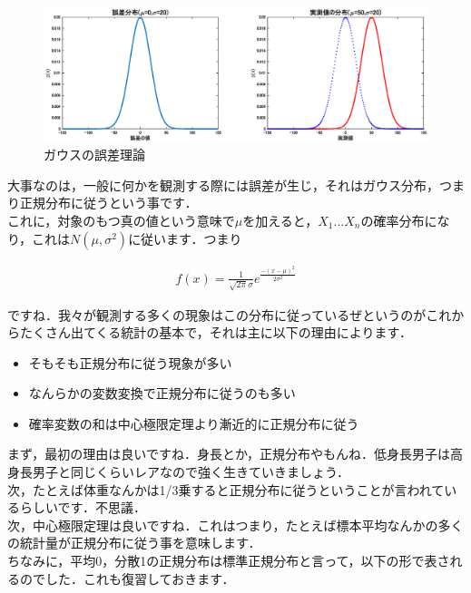 \documentclass[11pt,a4paper,uplatex]{ujreport} 	%
\begin{document}
\begin{figure}[H]
  \centering
  \includegraphics[width=18cm]{../figures/gauss-error.eps}
  \caption{ガウスの誤差理論}
\end{figure}

大事なのは，一般に何かを観測する際には誤差が生じ，それはガウス分布，つまり正規分布に従うという事です．\\

これに，対象のもつ真の値という意味で$\mu$を加えると，$X_1...X_n$の確率分布になり，これは$N(\mu, \sigma^2)$に従います．つまり

\begin{align}
  f(x) = \frac{1}{\sqrt{2\pi}\sigma}e^{\frac{-(x-\mu)^2}{2\sigma^2}}
\end{align}

ですね．我々が観測する多くの現象はこの分布に従っているぜというのがこれからたくさん出てくる統計の基本で，それは主に以下の理由によります．

\begin{itemize}
  \item そもそも正規分布に従う現象が多い
  \item なんらかの変数変換で正規分布に従うのも多い
  \item 確率変数の和は中心極限定理より漸近的に正規分布に従う
\end{itemize}

まず，最初の理由は良いですね．身長とか，正規分布やもんね．低身長男子は高身長男子と同じくらいレアなので強く生きていきましょう．\\

次，たとえば体重なんかは1/3乗すると正規分布に従うということが言われているらしいです．不思議．\\

次，中心極限定理は良いですね．これはつまり，たとえば標本平均なんかの多くの統計量が正規分布に従う事を意味します．
\\

ちなみに，平均0，分散1の正規分布は標準正規分布と言って，以下の形で表されるのでした．これも復習しておきます．
\end{document}
